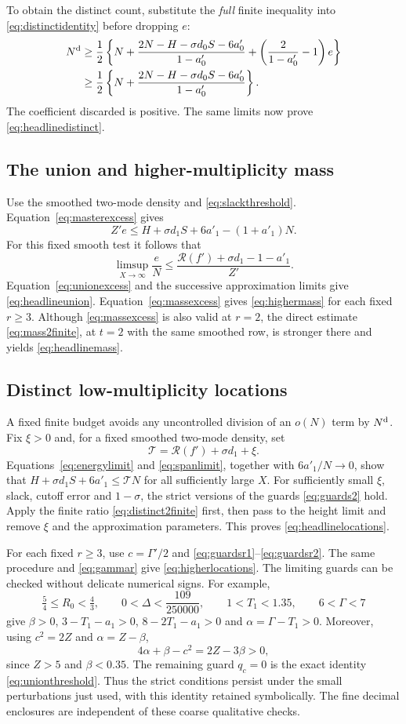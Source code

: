 \documentclass[11pt]{amsart}
\numberwithin{equation}{section}
\newcommand{\Nd}{N^{\rm d}}
\begin{document}
To obtain the distinct count, substitute the \emph{full} finite
inequality into \eqref{eq:distinctidentity} before dropping $e$:
\begin{align*}
 \Nd&\ge\frac12\left\{N+
    \frac{2N-H-\sigma d_0S-6a'_0}{1-a'_0}
            +\left(\frac2{1-a'_0}-1\right)e\right\}\\
 &\ge\frac12\left\{N+
    \frac{2N-H-\sigma d_0S-6a'_0}{1-a'_0}\right\}.
\end{align*}
The coefficient discarded is positive. The same limits now prove
\eqref{eq:headlinedistinct}.

\subsection{The union and higher-multiplicity mass}

Use the smoothed two-mode density and \eqref{eq:slackthreshold}.
Equation~\eqref{eq:masterexcess} gives
\[
 Z'e\le H+\sigma d_1S+6a'_1-(1+a'_1)N.
\]
For this fixed smooth test it follows that
\[
 \limsup_{X\to\infty}\frac eN
 \le\frac{\mathcal R(f')+\sigma d_1-1-a'_1}{Z'}.
\]
Equation~\eqref{eq:unionexcess} and the successive approximation
limits give \eqref{eq:headlineunion}. Equation~\eqref{eq:massexcess}
gives \eqref{eq:highermass} for each fixed $r\ge3$. Although
\eqref{eq:massexcess} is also valid at $r=2$, the direct estimate
\eqref{eq:mass2finite}, at $t=2$ with the same smoothed row, is
stronger there and yields \eqref{eq:headlinemass}.

\subsection{Distinct low-multiplicity locations}

A fixed finite budget avoids any uncontrolled division of an
$o(N)$ term by $\Nd$. Fix $\xi>0$ and, for a fixed smoothed
two-mode density, set
\[
 \mathcal T=\mathcal R(f')+\sigma d_1+\xi.
\]
Equations~\eqref{eq:energylimit} and \eqref{eq:spanlimit}, together
with $6a'_1/N\to0$, show that
$H+\sigma d_1S+6a'_1\le\mathcal T N$ for all sufficiently large
$X$. For sufficiently small $\xi$, slack, cutoff error and
$1-\sigma$, the strict versions of the guards
\eqref{eq:guards2} hold. Apply the finite ratio
\eqref{eq:distinct2finite} first, then pass to the height limit
and remove $\xi$ and the approximation parameters. This proves
\eqref{eq:headlinelocations}.

For each fixed $r\ge3$, use $c=\Gamma'/2$ and
\eqref{eq:guardsr1}--\eqref{eq:guardsr2}. The same procedure and
\eqref{eq:gammar} give \eqref{eq:higherlocations}. The limiting
guards can be checked without delicate numerical signs. For example,
\[
 \tfrac54\le R_0<\tfrac43,\qquad
 0<\Delta<\frac{109}{250000},\qquad 1<T_1<1.35,
 \qquad 6<\Gamma<7
\]
give $\beta>0$, $3-T_1-a_1>0$, $8-2T_1-a_1>0$ and
$\alpha=\Gamma-T_1>0$. Moreover, using $c^2=2Z$ and
$\alpha=Z-\beta$,
\[
 4\alpha+\beta-c^2=2Z-3\beta>0,
\]
since $Z>5$ and $\beta<0.35$. The remaining guard $q_c=0$ is
the exact identity \eqref{eq:unionthreshold}. Thus the strict
conditions persist under the small perturbations just used, with
this identity retained symbolically. The fine decimal enclosures
are independent of these coarse qualitative checks.
\end{document}
